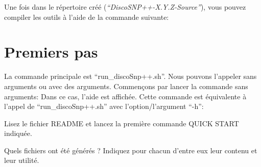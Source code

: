 
Une fois dans le répertoire créé (\emph{``DiscoSNP++-X.Y.Z-Source''}), vous pouvez compiler les outils à l'aide de la commande suivante:








\section*{Premiers pas}
La commande principale est ``run\_discoSnp++.sh''. Nous pouvons l'appeler sans arguments ou avec des arguments. Commençons par lancer la commande sans arguments:
Dans ce cas, l'aide est affichée. Cette commande est équivalente à l'appel de ``run\_discoSnp++.sh'' avec l'option/l'argument ``-h'':




\qu {} Lisez le fichier README et lancez la première commande QUICK START indiquée.

\qu {} Quels fichiers ont été générés ? Indiquez pour chacun d'entre eux leur contenu et leur utilité. 

